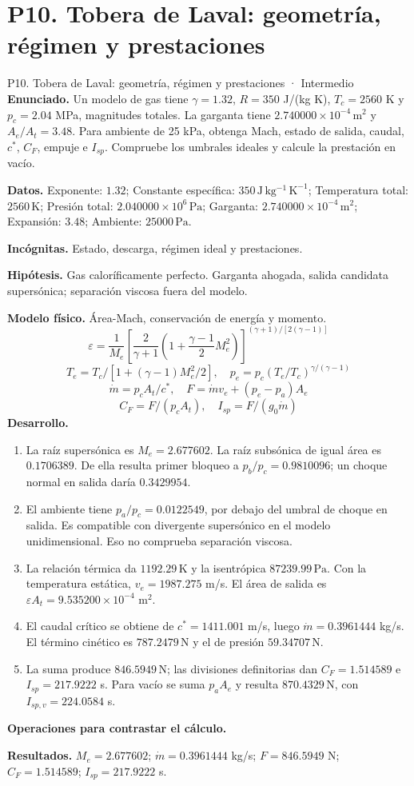 \section{P10. Tobera de Laval: geometría, régimen y prestaciones}
\begin{studiumworked}{P10. Tobera de Laval: geometría, régimen y prestaciones · Intermedio}
\textbf{Enunciado.} Un modelo de gas tiene $\gamma=1.32$, $R=350$ J/(kg K), $T_c=2560$ K y $p_c=2.04$ MPa, magnitudes totales. La garganta tiene $2.740000\times10^{-4}\,\mathrm{m^2}$ y $A_e/A_t=3.48$. Para ambiente de 25 kPa, obtenga Mach, estado de salida, caudal, $c^*$, $C_F$, empuje e $I_{sp}$. Compruebe los umbrales ideales y calcule la prestación en vacío.

\textbf{Datos.} Exponente: $1.32$; Constante específica: $350\,\mathrm{J\,kg^{-1}\,K^{-1}}$; Temperatura total: $2560\,\mathrm{K}$; Presión total: $2.040000\times10^{6}\,\mathrm{Pa}$; Garganta: $2.740000\times10^{-4}\,\mathrm{m^2}$; Expansión: $3.48$; Ambiente: $25000\,\mathrm{Pa}$.

\textbf{Incógnitas.} Estado, descarga, régimen ideal y prestaciones.

\textbf{Hipótesis.} Gas caloríficamente perfecto. Garganta ahogada, salida candidata supersónica; separación viscosa fuera del modelo.

\textbf{Modelo físico.} Área-Mach, conservación de energía y momento.
\[\varepsilon=\frac1{M_e}\left[\frac2{\gamma+1}(1+\frac{\gamma-1}2M_e^2)\right]^{(\gamma+1)/[2(\gamma-1)]}\]
\[T_e=T_c/[1+(\gamma-1)M_e^2/2],\quad p_e=p_c(T_e/T_c)^{\gamma/(\gamma-1)}\]
\[\dot m=p_cA_t/c^*,\quad F=\dot m v_e+(p_e-p_a)A_e\]
\[C_F=F/(p_cA_t),\quad I_{sp}=F/(g_0\dot m)\]
\textbf{Desarrollo.}
\begin{enumerate}
\item La raíz supersónica es $M_e=2.677602$. La raíz subsónica de igual área es $0.1706389$. De ella resulta primer bloqueo a $p_b/p_c=0.9810096$; un choque normal en salida daría $0.3429954$.
\item El ambiente tiene $p_a/p_c=0.0122549$, por debajo del umbral de choque en salida. Es compatible con divergente supersónico en el modelo unidimensional. Eso no comprueba separación viscosa.
\item La relación térmica da $1192.29\,\mathrm{K}$ y la isentrópica $87239.99\,\mathrm{Pa}$. Con la temperatura estática, $v_e=1987.275$ m/s. El área de salida es $\varepsilon A_t=9.535200\times10^{-4}$ m$^2$.
\item El caudal crítico se obtiene de $c^*=1411.001$ m/s, luego $\dot m=0.3961444$ kg/s. El término cinético es $787.2479\,\mathrm{N}$ y el de presión $59.34707\,\mathrm{N}$.
\item La suma produce $846.5949\,\mathrm{N}$; las divisiones definitorias dan $C_F=1.514589$ e $I_{sp}=217.9222$ s. Para vacío se suma $p_aA_e$ y resulta $870.4329\,\mathrm{N}$, con $I_{sp,v}=224.0584$ s.
\end{enumerate}
\textbf{Operaciones para contrastar el cálculo.}

\textbf{Resultados.} $M_e=2.677602$; $\dot m=0.3961444$ kg/s; $F=846.5949$ N; $C_F=1.514589$; $I_{sp}=217.9222$ s.


\end{studiumworked}
